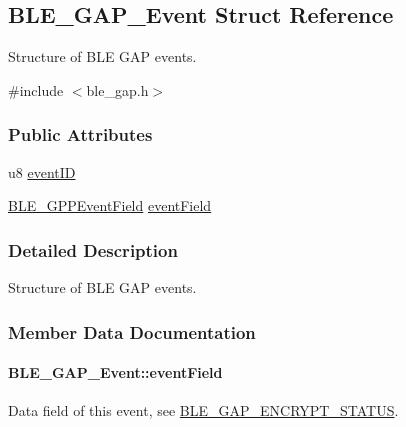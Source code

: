 \hypertarget{struct_b_l_e___g_a_p___event}{}\subsection{B\+L\+E\+\_\+\+G\+A\+P\+\_\+\+Event Struct Reference}
\label{struct_b_l_e___g_a_p___event}


Structure of B\+LE G\+AP events.  




{\ttfamily \#include $<$ble\+\_\+gap.\+h$>$}

\subsubsection*{Public Attributes}
\begin{DoxyCompactItemize}
\item 
u8 \hyperlink{struct_b_l_e___g_a_p___event_af1575452800a56e0d60c352094d681dc}{event\+ID}
\item 
\hyperlink{union_b_l_e___g_p_p_event_field}{B\+L\+E\+\_\+\+G\+P\+P\+Event\+Field} \hyperlink{struct_b_l_e___g_a_p___event_ad43a9e84dd06676298a2db0e397fb917}{event\+Field}
\end{DoxyCompactItemize}


\subsubsection{Detailed Description}
Structure of B\+LE G\+AP events. 

\subsubsection{Member Data Documentation}
\paragraph[{\texorpdfstring{event\+Field}{eventField}}]{ B\+L\+E\+\_\+\+G\+A\+P\+\_\+\+Event\+::event\+Field}\hypertarget{struct_b_l_e___g_a_p___event_ad43a9e84dd06676298a2db0e397fb917}{}\label{struct_b_l_e___g_a_p___event_ad43a9e84dd06676298a2db0e397fb917}
Data field of this event, see \hyperlink{group___b_l_e___g_a_p___e_n_c_r_y_p_t___s_t_a_t_u_s}{B\+L\+E\+\_\+\+G\+A\+P\+\_\+\+E\+N\+C\+R\+Y\+P\+T\+\_\+\+S\+T\+A\+T\+US}. 
